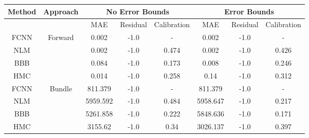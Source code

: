 \documentclass[convert={outext=.png}]{standalone}
\begin{document}
\centering
\label{tab:experimental_results}

\begin{tabular}{c c c c c c c c}

\hline
\hline
Method & Approach &  \multicolumn{3}{c}{No Error Bounds} & \multicolumn{3}{c}{Error Bounds} \\ \hline
 && MAE & Residual & Calibration & MAE & Residual & Calibration\\
 FCNN & \multirow{4}{*}{Forward} & 0.002 & -1.0 & - & 0.002 & -1.0 & - \\
 NLM &  & 0.002 & -1.0 & 0.474 & 0.002 & -1.0 & 0.426 \\
 BBB &  & 0.084 & -1.0 & 0.173 & 0.008 & -1.0 & 0.246 \\
 HMC &  & 0.014 & -1.0 & 0.258 & 0.14 & -1.0 & 0.312 \\
 \hline
 FCNN & \multirow{4}{*}{Bundle} & 811.379 & -1.0 & - & 811.379 & -1.0 & - \\
 NLM &  & 5959.592 & -1.0 & 0.484 & 5958.647 & -1.0 & 0.217 \\
 BBB &  & 5261.858 & -1.0 & 0.222 & 5848.636 & -1.0 & 0.171 \\
 HMC &  & 3155.62 & -1.0 & 0.34 & 3026.137 & -1.0 & 0.397 \\
\hline
\hline
\end{tabular}
\end{document}
